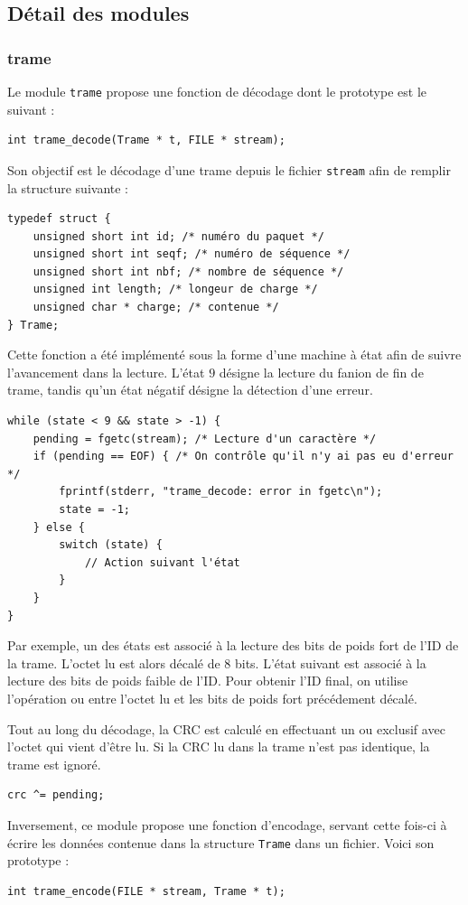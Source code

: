 \documentclass[a4paper,11pt]{article}
\begin{document}
\subsection{Détail des modules}

\subsubsection{trame}
Le module \texttt{trame} propose une fonction de décodage dont le prototype est le suivant :
\begin{verbatim}
int trame_decode(Trame * t, FILE * stream);
\end{verbatim}
Son objectif est le décodage d'une trame depuis le fichier \texttt{stream} afin de remplir la structure suivante :
\begin{verbatim}
typedef struct {
    unsigned short int id; /* numéro du paquet */
    unsigned short int seqf; /* numéro de séquence */
    unsigned short int nbf; /* nombre de séquence */
    unsigned int length; /* longeur de charge */
    unsigned char * charge; /* contenue */
} Trame;
\end{verbatim}
Cette fonction a été implémenté sous la forme d'une machine à état afin
de suivre l'avancement dans la lecture. L'état $9$ désigne la lecture du
fanion de fin de trame, tandis qu'un état négatif désigne la détection
d'une erreur.
\begin{verbatim}
while (state < 9 && state > -1) {
    pending = fgetc(stream); /* Lecture d'un caractère */
    if (pending == EOF) { /* On contrôle qu'il n'y ai pas eu d'erreur */
        fprintf(stderr, "trame_decode: error in fgetc\n");
        state = -1; 
    } else {
        switch (state) {
            // Action suivant l'état
        }
    }
}
\end{verbatim}
Par exemple, un des états est associé à la lecture des bits de poids fort
de l'ID de la trame. L'octet lu est alors décalé de 8 bits. L'état suivant
est associé à la lecture des bits de poids faible de l'ID. Pour obtenir
l'ID final, on utilise l'opération ou entre l'octet lu et les bits de poids
fort précédement décalé.

Tout au long du décodage, la CRC est calculé en effectuant un ou exclusif
avec l'octet qui vient d'être lu. Si la CRC lu dans la trame n'est pas
identique, la trame est ignoré.
\begin{verbatim}
crc ^= pending;
\end{verbatim}

Inversement, ce module propose une fonction d'encodage, servant cette
fois-ci à écrire les données contenue dans la structure \texttt{Trame}
dans un fichier. Voici son prototype :
\begin{verbatim}
int trame_encode(FILE * stream, Trame * t);
\end{verbatim}
\end{document}

